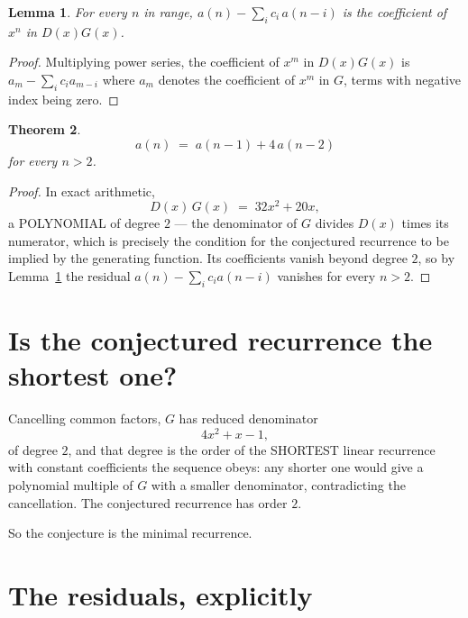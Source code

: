 \documentclass[11pt,a4paper]{article}
\theoremstyle{plain}
\newtheorem{theorem}{Theorem}
\newtheorem{lemma}[theorem]{Lemma}
\theoremstyle{definition}
\begin{document}
\begin{lemma}\label{lem:key}
For every $n$ in range, $a(n)-\sum_i c_i\,a(n-i)$ is the coefficient of $x^{n}$ in
$D(x)G(x)$.
\end{lemma}

\begin{proof}
Multiplying power series, the coefficient of $x^{m}$ in $D(x)G(x)$ is
$a_m-\sum_i c_i a_{m-i}$ where $a_m$ denotes the coefficient of $x^{m}$ in $G$, terms with
negative index being zero.
\end{proof}

\begin{theorem}
\[
a(n)\;=\;a(n-1) + 4\,a(n-2)
\]
for every $n>2$.
\end{theorem}

\begin{proof}
In exact arithmetic,
\[
D(x)\,G(x)\;=\;32 x^{2} + 20 x,
\]
a POLYNOMIAL of degree $2$ --- the denominator of $G$ divides $D(x)$ times its numerator,
which is precisely the condition for the conjectured recurrence to be implied by the
generating function. Its coefficients vanish beyond degree $2$, so by
Lemma~\ref{lem:key} the residual $a(n)-\sum_ic_ia(n-i)$ vanishes for every
$n>2$.
\end{proof}

\section{Is the conjectured recurrence the shortest one?}

Cancelling common factors, $G$ has reduced denominator
\[
4 x^{2} + x - 1,
\]
of degree $2$, and that degree is the order of the SHORTEST linear recurrence with
constant coefficients the sequence obeys: any shorter one would give a polynomial multiple of
$G$ with a smaller denominator, contradicting the cancellation. The conjectured recurrence has
order $2$.

So the conjecture is the minimal recurrence.

\section{The residuals, explicitly}
\end{document}

